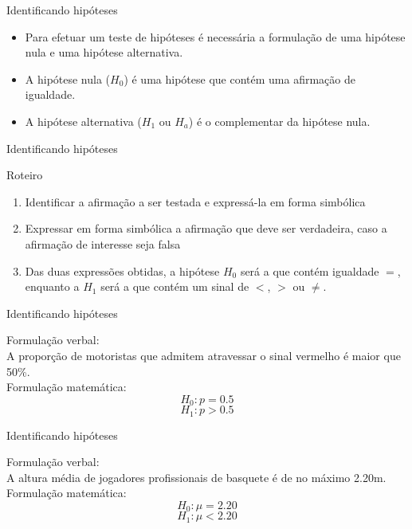 \documentclass{beamer}
\begin{document}
\begin{frame}{Identificando hipóteses}
  \begin{itemize}
  \item Para efetuar um teste de hipóteses é necessária a formulação
    de uma \alert{hipótese nula} e uma \alert{hipótese alternativa}.
  \item A hipótese nula ($H_0$) é uma hipótese que contém uma
    afirmação de igualdade.
  \item A hipótese alternativa ($H_1$ ou $H_a$) é o complementar da
    hipótese nula.
  \end{itemize}
\end{frame}

\begin{frame}{Identificando hipóteses}
  \begin{block}{Roteiro}
    \begin{enumerate}
    \item Identificar a afirmação a ser testada e expressá-la em forma simbólica
    \item Expressar em forma simbólica a afirmação que deve ser
      verdadeira, caso a afirmação de interesse seja falsa
    \item Das duas expressões obtidas, a hipótese $H_0$ será a que
      contém igualdade $=$, enquanto a $H_1$ será a que contém um
      sinal de $<$, $>$ ou $\ne$.
    \end{enumerate}
  \end{block}
\end{frame}

\begin{frame}{Identificando hipóteses}
  \begin{example}
    Formulação verbal:\\
    A proporção de motoristas que admitem atravessar o sinal vermelho
    é maior que 50\%.\\
    \bigskip
    Formulação matemática:\\
    \begin{displaymath}
      H_0: p=0.5
    \end{displaymath}
    \begin{displaymath}
      H_1: p>0.5
    \end{displaymath}
  \end{example}
\end{frame}

\begin{frame}{Identificando hipóteses}
  \begin{example}
    Formulação verbal:\\
    A altura média de jogadores profissionais de basquete é de no
    máximo 2.20m.\\
    \bigskip
    Formulação matemática:\\
    \begin{displaymath}
      H_0: \mu = 2.20
    \end{displaymath}
    \begin{displaymath}
      H_1: \mu < 2.20
    \end{displaymath}
  \end{example}
\end{frame}
\end{document}
